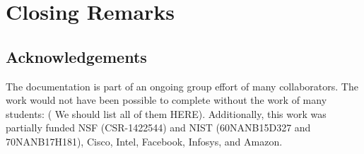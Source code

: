 
\chapter{Closing Remarks}
\section{Acknowledgements}
The documentation is part of an ongoing group effort of many collaborators. The
work would not have been possible to complete without the work of many
students: ( We should list all of them HERE).  Additionally, this work was
partially funded NSF (CSR-1422544) and NIST (60NANB15D327 and 70NANB17H181),
Cisco, Intel, Facebook, Infosys, and Amazon.

